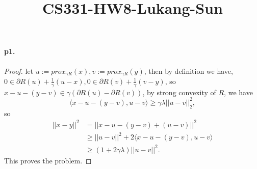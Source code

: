 \documentclass[12pt,a4paper]{article}
\title{CS331-HW8-Lukang-Sun}
\begin{document}
	\maketitle
	\paragraph{p1.}
	\begin{proof}
		let $u:=prox_{\gamma R}(x), v:=prox_{\gamma R}(y)$, then by definition we have, $0\in \partial R(u)+\frac{1}{\gamma}(u-x),0\in \partial R(v)+\frac{1}{\gamma}(v-y)$, so $x-u-(y-v)\in \gamma (\partial R(u)-\partial R(v))$, by strong convexity of $R$, we have
		\begin{equation}
			\langle x-u-(y-v),u-v\rangle \geq \gamma\lambda ||u-v||_2^2,
		\end{equation}
	so 
	\begin{equation}
		\begin{aligned}
			||x-y||^2&=||x-u-(y-v)+(u-v)||^2\\
						&\geq ||u-v||^2+2\langle x-u-(y-v), u-v\rangle\\
						&\geq (1+2\gamma \lambda)||u-v||^2.
		\end{aligned}
	\end{equation}
This proves the problem.
	\end{proof}
\end{document}
